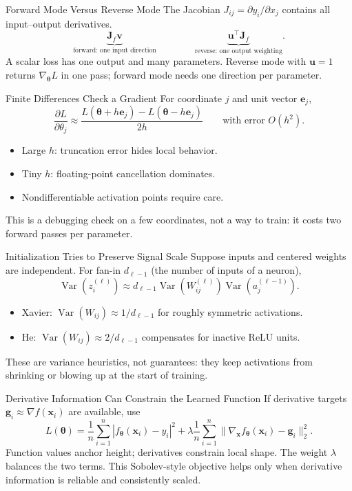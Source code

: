 \documentclass{ntuabeamer}
\begin{document}
\appendix


\begin{frame}{Forward Mode Versus Reverse Mode}
  The Jacobian $J_{ij}=\partial y_i/\partial x_j$ contains all input--output derivatives.
  \[
    \underbrace{\mathbf J_f\mathbf v}_{\text{forward: one input direction}}
    \qquad\qquad
    \underbrace{\mathbf u^\top\mathbf J_f}_{\text{reverse: one output weighting}}.
  \]
  A scalar loss has one output and many parameters. Reverse mode with $\mathbf u=1$ returns $\nabla_{\boldsymbol\theta}L$ in one pass; forward mode needs one direction per parameter.
\end{frame}

\begin{frame}{Finite Differences Check a Gradient}
  For coordinate $j$ and unit vector $\mathbf e_j$,
  \[
    \frac{\partial L}{\partial\theta_j}
    \approx
    \frac{L(\boldsymbol\theta+h\mathbf e_j)-L(\boldsymbol\theta-h\mathbf e_j)}{2h}
    \qquad\text{with error }O(h^2).
  \]
  \begin{itemize}
    \item Large $h$: truncation error hides local behavior.
    \item Tiny $h$: floating-point cancellation dominates.
    \item Nondifferentiable activation points require care.
  \end{itemize}
  This is a debugging check on a few coordinates, not a way to train: it costs two forward passes per parameter.
\end{frame}

\begin{frame}{Initialization Tries to Preserve Signal Scale}
  Suppose inputs and centered weights are independent. For fan-in $d_{\ell-1}$ (the number of inputs of a neuron),
  \[
    \operatorname{Var}(z_i^{(\ell)})
    \approx d_{\ell-1}\operatorname{Var}(W_{ij}^{(\ell)})
      \operatorname{Var}(a_j^{(\ell-1)}).
  \]
  \begin{itemize}
    \item Xavier: $\operatorname{Var}(W_{ij})\approx 1/d_{\ell-1}$ for roughly symmetric activations.
    \item He: $\operatorname{Var}(W_{ij})\approx 2/d_{\ell-1}$ compensates for inactive ReLU units.
  \end{itemize}
  These are variance heuristics, not guarantees: they keep activations from shrinking or blowing up at the start of training.
\end{frame}

\begin{frame}{Derivative Information Can Constrain the Learned Function}
  If derivative targets $\mathbf g_i\approx\nabla f(\mathbf x_i)$ are available, use
  \[
    L(\boldsymbol\theta)
    =\frac1n\sum_{i=1}^n|f_{\boldsymbol\theta}(\mathbf x_i)-y_i|^2
    +\lambda\frac1n\sum_{i=1}^n
      \|\nabla_{\mathbf x}f_{\boldsymbol\theta}(\mathbf x_i)-\mathbf g_i\|_2^2.
  \]
  Function values anchor height; derivatives constrain local shape. The weight $\lambda$ balances the two terms.
  This Sobolev-style objective helps only when derivative information is reliable and consistently scaled.
\end{frame}
\end{document}
